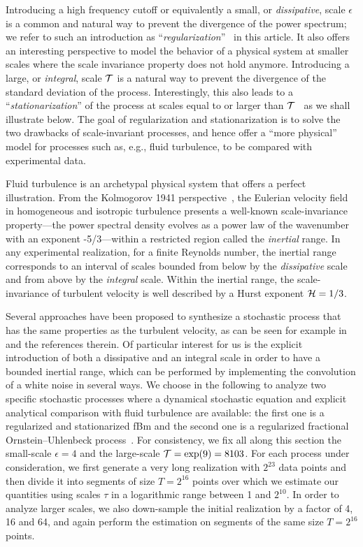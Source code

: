 \documentclass[aps,pra,groupedaddress,notitlepage]{revtex4-1}
\begin{document}
Introducing a high frequency cutoff or equivalently a small, or {\em dissipative}, %
scale $\epsilon$ is a common and natural way to prevent the divergence of the power spectrum; we refer to such an introduction as ``{\em regularization}''~\cite{Pereira2016} in this article. It also offers an interesting perspective to model the behavior of a physical system at smaller scales where the scale invariance property does not hold anymore. Introducing a large, or {\em integral}, scale ${\cal T}$ is a natural way to prevent the divergence of the standard deviation of the process. Interestingly, this also leads to a ``{\em stationarization}'' of the process at scales equal to or larger than ${\cal T}$~\cite{Chevillard2017} as we shall illustrate below. The goal of regularization and stationarization is to solve the two drawbacks of scale-invariant processes, and hence offer a ``more physical'' model for processes such as, e.g., fluid turbulence, to be compared with experimental data.

Fluid turbulence is an archetypal physical system that offers a perfect illustration. From the Kolmogorov 1941 perspective~\cite{Kolmogorov1991,Frisch:1995}, the Eulerian velocity field in homogeneous and isotropic turbulence presents a well-known scale-invariance property---the power spectral density evolves as a power law of the wavenumber with an exponent -5/3---within a 
restricted region called the {\em inertial} range. In any experimental realization, for a finite Reynolds number, the inertial range corresponds to an interval of scales bounded from below by the {\em dissipative} scale and from above by the {\em integral} scale. Within the inertial range, the scale-invariance of turbulent velocity is well described by a Hurst exponent ${\cal H}=1/3$.

{Several approaches have been proposed to synthesize a stochastic process that has the same properties as the turbulent velocity, as can be seen for example in~\cite{Dimitriadis:2018} and the references therein. Of particular interest for us is the explicit introduction of both a dissipative and an integral scale in order to have a bounded inertial range, which can be performed by implementing the convolution of a white noise in several ways. We choose in the following to analyze two specific stochastic processes where a dynamical stochastic equation and explicit analytical comparison with fluid turbulence are available: the first one is a regularized and stationarized fBm and the second one is a regularized fractional Ornstein--Uhlenbeck process~\cite{Chevillard2017}.}
For consistency, we fix all along this section the small-scale $\epsilon=4$ and the large-scale ${\cal T}=\exp(9)=8103$.
For each process under consideration, we first generate a very long realization with $2^{23}$ data points and then divide it into segments of size $T=2^{16}$ points over which we estimate our quantities using scales $\tau$ in a logarithmic range between 1 and $2^{10}$. In order to analyze larger scales, we also down-sample the initial realization by a factor of 4, 16 and 64, and again perform the estimation on segments of the same size $T=2^{16}$ points.
\end{document}
